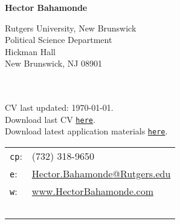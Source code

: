 \documentclass[letterpaper]{article}
\def\name{Hector Bahamonde}
\renewenvironment{itemize}{
  \begin{list}{}{
    \setlength{\leftmargin}{1.5em}
  }
}{
  \end{list}
}
\begin{document}

\centerline{\huge \bf \name}

\vspace{0.25in}

\begin{minipage}{0.45\linewidth}
  Rutgers University, New Brunswick \\
  Political Science Department \\
  Hickman Hall \\
  New Brunswick, NJ 08901\\
  \\
  \\
\begin{footnotesize}
 CV last updated: \today. \\
 Download last CV \href{https://github.com/hbahamonde/Job_Market/raw/master/Bahamonde_CV.pdf}{\texttt{here}}.\\
 Download latest application materials \href{http://www.hectorbahamonde.com}{\texttt{here}}.
\end{footnotesize}

\end{minipage}
\begin{minipage}{0.45\linewidth}
  \begin{tabular}{ll}
    \texttt{cp}: & (732) 318-9650 \\
    \texttt{e}: & \href{mailto:hector.bahamonde@rutgers.edu}{Hector.Bahamonde@Rutgers.edu} \\
    \texttt{w}: & \href{http://www.hectorbahamonde.com}{www.HectorBahamonde.com}
    \\
    \\
    \\
    \\
    \\
    \\
  \end{tabular}
\end{minipage}


%
\end{document}
